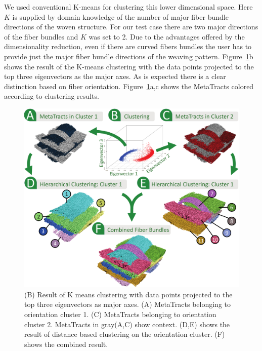 %  
We used conventional K-means for clustering this lower dimensional space. Here $K$ is supplied by domain knowledge of the number of major fiber bundle directions of the woven structure.
For our test case there are two major directions of the fiber bundles and $K$ was set to 2. Due to the advantages offered by the dimensionality reduction, even if there are curved fibers bundles the user has to provide just the major fiber bundle directions of the weaving pattern. Figure~\ref{fig:orientation_clustering}b shows the result of the K-means clustering with the data points projected to the top three eigenvectors as the major axes. As is expected there is a clear distinction based on fiber orientation. Figure~\ref{fig:orientation_clustering}a,c shows the MetaTracts colored according to clustering results.


\begin{figure}[tb] 
  \centering  	
  \includegraphics[width=\linewidth]{images_pvis/clustering.pdf}
  	\caption{(B) Result of K means clustering with data points projected to the top three eigenvectors as major axes. (A) MetaTracts belonging to orientation cluster 1. (C) MetaTracts belonging to orientation cluster 2. MetaTracts in gray(A,C) show context.
  	(D,E) shows the result of distance based clustering on the orientation cluster. (F) shows the combined result. }
  \label{fig:orientation_clustering}
  \end{figure}

